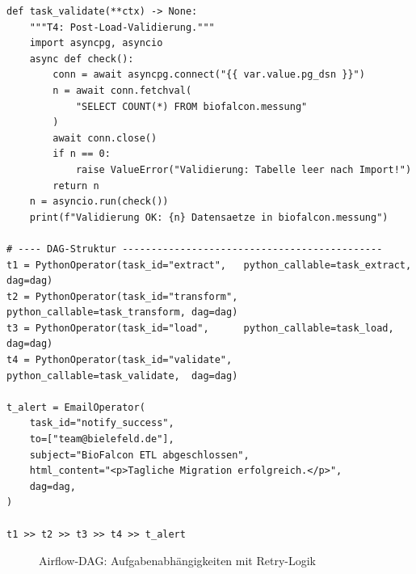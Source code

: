 \documentclass[12pt,a4paper]{report}
\theoremstyle{definition}
\theoremstyle{remark}
\begin{document}
\begin{lstlisting}[style=python, caption={airflow\_dag.py: ETL-Pipeline als Airflow-DAG}, label=lst:airflow]
def task_validate(**ctx) -> None:
    """T4: Post-Load-Validierung."""
    import asyncpg, asyncio
    async def check():
        conn = await asyncpg.connect("{{ var.value.pg_dsn }}")
        n = await conn.fetchval(
            "SELECT COUNT(*) FROM biofalcon.messung"
        )
        await conn.close()
        if n == 0:
            raise ValueError("Validierung: Tabelle leer nach Import!")
        return n
    n = asyncio.run(check())
    print(f"Validierung OK: {n} Datensaetze in biofalcon.messung")

# ---- DAG-Struktur ---------------------------------------------
t1 = PythonOperator(task_id="extract",   python_callable=task_extract,  dag=dag)
t2 = PythonOperator(task_id="transform", python_callable=task_transform, dag=dag)
t3 = PythonOperator(task_id="load",      python_callable=task_load,      dag=dag)
t4 = PythonOperator(task_id="validate",  python_callable=task_validate,  dag=dag)

t_alert = EmailOperator(
    task_id="notify_success",
    to=["team@bielefeld.de"],
    subject="BioFalcon ETL abgeschlossen",
    html_content="<p>Tagliche Migration erfolgreich.</p>",
    dag=dag,
)

t1 >> t2 >> t3 >> t4 >> t_alert
\end{lstlisting}

\begin{figure}[H]
\centering
{}
\caption{Airflow-DAG: Aufgabenabhängigkeiten mit Retry-Logik}
\label{fig:dag}
\end{figure}
\end{document}
